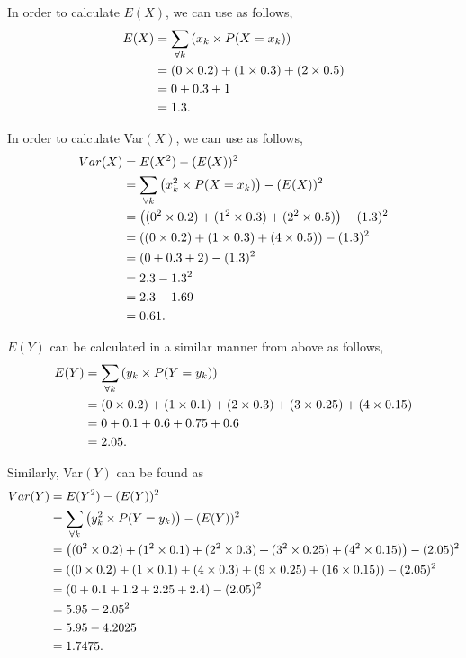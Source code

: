 \begin{subquestions}
\begin{subsubquestions}
\begin{subsubsubquestions}
\subsubsubquestion

In order to calculate $E(X)$, we can use  as follows,
\begin{align}
	E(X) & =  \sum_{\forall k} \left(x_k \times P(X=x_k) \right) \nonumber \\
	     & = (0 \times 0.2)+(1 \times 0.3)+(2 \times 0.5) \nonumber \\
	     & = 0 + 0.3 + 1 \nonumber \\
	     & = 1.3.
\end{align}
	
\subsubsubquestion

In order to calculate Var$(X)$, we can use  as follows,
\begin{align}
	Var(X) & = E(X^2) - (E(X))^2 \nonumber \\
	       & =  \sum_{\forall k} \left(x^2_k \times P(X=x_k) \right) - (E(X))^2 \nonumber \\
	       & = \left((0^2 \times 0.2) + (1^2 \times 0.3) + (2^2 \times 0.5) \right) - (1.3)^2 \nonumber \\
	       & = \left((0 \times 0.2) + (1 \times 0.3) + (4 \times 0.5) \right) - (1.3)^2 \nonumber \\
	       & = \left(0 + 0.3 + 2 \right) - (1.3)^2 \nonumber \\
	       & = 2.3 - 1.3^2 \nonumber \\
	       & = 2.3 - 1.69 \nonumber \\
	       & = 0.61.
\end{align}
	
\subsubsubquestion

$E(Y)$ can be calculated in a similar manner from above as follows,
\begin{align}
	E(Y) & =  \sum_{\forall k} \left(y_k \times P(Y=y_k) \right) \nonumber \\
	& = (0 \times 0.2)+(1 \times 0.1)+(2 \times 0.3)+(3 \times 0.25)+(4 \times 0.15)\nonumber \\
	& = 0 + 0.1 + 0.6 + 0.75 + 0.6 \nonumber \\
	& = 2.05.
\end{align}

\subsubsubquestion

Similarly, Var$(Y)$ can be found as
\begin{align}
	Var(Y) & = E(Y^2) - (E(Y))^2 \nonumber \\
	& =  \sum_{\forall k} \left(y^2_k \times P(Y=y_k) \right) - (E(Y))^2 \nonumber \\
	& = \left((0^2 \times 0.2) + (1^2 \times 0.1) + (2^2 \times 0.3) + (3^2 \times 0.25) + (4^2 \times 0.15)\right) - (2.05)^2 \nonumber \\
	& = \left((0 \times 0.2) + (1 \times 0.1) + (4 \times 0.3) + (9 \times 0.25) + (16 \times 0.15) \right) - (2.05)^2 \nonumber \\
	& = \left(0 + 0.1 + 1.2 + 2.25 + 2.4 \right) - (2.05)^2 \nonumber \\
	& = 5.95 - 2.05^2 \nonumber \\
	& = 5.95 - 4.2025 \nonumber \\
	& = 1.7475.
\end{align}


\end{subsubsubquestions}
\end{subsubquestions}
\end{subquestions}
